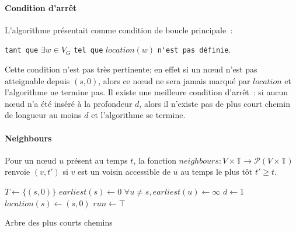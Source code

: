 \documentclass[12pt,a4paper]{article}
\begin{document}
\paragraph{Condition d'arrêt}
L'algorithme présentait comme condition de boucle principale~:
\begin{center}
  \verb|tant que| \(\exists w \in V_G\) \verb|tel que| \(location(w)\)
  \verb|n'est pas définie|.
\end{center}
Cette condition n'est pas très pertinente; en effet si un nœud n'est
pas atteignable depuis \((s, 0)\), alors ce nœud ne sera jamais marqué
par \(location\) et l'algorithme ne termine pas. Il existe une
meilleure condition d'arrêt~: si aucun nœud n'a été inséré à la
profondeur \(d\), alors il n'existe pas de plus court chemin de
longueur au moins \(d\) et l'algorithme se termine.

\paragraph{Neighbours}
Pour un nœud \(u\) présent au temps \(t\), la fonction
\(neighbours : V \times \mathbb{T} \to \mathcal{P}(V \times
\mathbb{T})\) renvoie \((v, t')\) si \(v\) est un voisin accessible de
\(u\) au temps le plus tôt \(t' \geq t\).\\

\begin{algorithm}[H]
  \DontPrintSemicolon{}
  \(T \leftarrow \{(s, 0)\}\)\;
  \(earliest(s) \leftarrow 0\)\;
  \(\forall u \neq s, earliest(u) \leftarrow \infty\)\;
  \(d \leftarrow 1\)\;
  \(location(s) \leftarrow (s, 0)\)\;
  \(run \leftarrow \top\)\;
  \caption{Arbre des plus courts chemins\label{alg:shortest_path}}
\end{algorithm}
\end{document}
